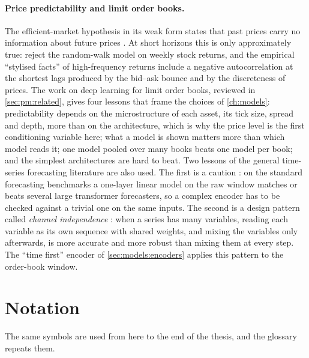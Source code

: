 \paragraph{Price predictability and limit order books.}
\label{sec:bg:lob}
The efficient-market hypothesis in its weak form states that past prices carry no
information about future prices \cite{fama1970efficient}.  At short horizons this is
only approximately true: \textcite{lo1988stock} reject the random-walk model on weekly
stock returns, and the empirical ``stylised facts'' of high-frequency returns
\cite{cont2001empirical} include a negative autocorrelation at the shortest lags
produced by the bid--ask bounce and by the discreteness of prices.  The work on deep
learning for limit order books, reviewed in \cref{sec:pm:related}, gives four lessons that
frame the choices of \cref{ch:models}: predictability depends on the microstructure of each
asset, its tick size, spread and depth, more than on the architecture, which is why the
price level is the first conditioning variable here; what a model is shown matters more
than which model reads it; one model pooled over many books beats one model per book; and
the simplest architectures are hard to beat.  Two lessons of the general time-series
forecasting literature are also used.  The first is a caution \cite{zeng2023transformers}:
on the standard forecasting benchmarks a one-layer linear model on the raw window matches
or beats several large transformer forecasters, so a complex encoder has to be checked
against a trivial one on the same inputs.  The second is a design pattern called
\emph{channel independence} \cite{nie2023patchtst}: when a series has many variables,
reading each variable as its own sequence with shared weights, and mixing the variables
only afterwards, is more accurate and more robust than mixing them at every step.  The
``time first'' encoder of \cref{sec:models:encoders} applies this pattern to the order-book
window.

\section{Notation}
\label{sec:bg:notation}

The same symbols are used from here to the end of the thesis, and the glossary repeats
them.


